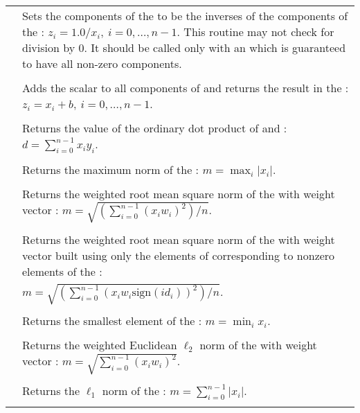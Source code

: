 \begin{supertabular}{|p{\colone}|p{\coltwo}|}
& Sets the components of the   to be the inverses
of the components of the  :
$z_i = 1.0 /  x_i  , \: i=0,\ldots,n-1$. This routine
may not check for division by $0$. It should be called only with an 
 which is guaranteed to have all non-zero components.
\\
%
 &  \\
& Adds the scalar  to all components of  and returns the
result in the  :
$z_i = x_i + b , \: i=0,\ldots,n-1$.
\\
%
 &  \\
& Returns the value of the ordinary dot product of  and :
$d=\sum_{i=0}^{n-1} x_i y_i$.
\\
%
 &  \\
& Returns the maximum norm of the  :
$m = \max_{i} | x_i |$.
\\
%
 &  \\
& Returns the weighted root mean square norm of the   with
weight vector :
$m = \sqrt{\left( \sum_{i=0}^{n-1} (x_i w_i)^2 \right) / n}$.
\\
%
 &  \\
& Returns the weighted root mean square norm of the   with
weight vector  built using only the elements of  corresponding to
nonzero elements of the  :\\
&$m = \sqrt{\left( \sum_{i=0}^{n-1} (x_i w_i \text{sign}(id_i))^2 \right) / n}$.
\\
%
 &  \\
& Returns the smallest element of the  :
$m = \min_i x_i $.
\\
%
 &  \\
& Returns the weighted Euclidean $\ell_2$ norm of the  
with weight vector : 
$m = \sqrt{\sum_{i=0}^{n-1} (x_i w_i)^2}$.
\\
%
 &  \\
& Returns the $\ell_1$ norm of the  :
$m = \sum_{i=0}^{n-1} | x_i |$.
\\
%
 &  \\

\end{supertabular}

